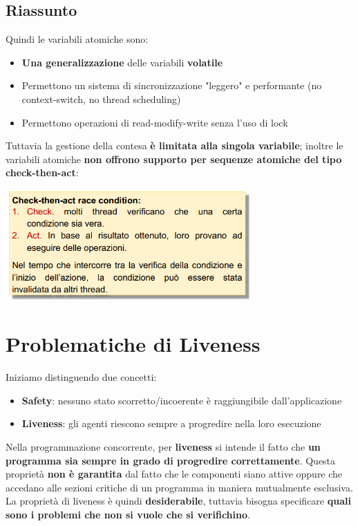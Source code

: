 \documentclass[12pt]{article}
\begin{document}
\subsection{Riassunto}
Quindi le variabili atomiche sono:
\begin{itemize}
    \item \textbf{Una generalizzazione} delle variabili \textbf{volatile}
    \item Permettono un sistema di sincronizzazione "leggero" e performante (no context-switch, no thread scheduling)
    \item Permettono operazioni di read-modify-write senza l'uso di lock
\end{itemize}
Tuttavia la gestione della contesa \textbf{è limitata alla singola variabile}; inoltre le variabili atomiche \textbf{non offrono supporto per sequenze atomiche del tipo check-then-act}:
\begin{center}
    \includegraphics[width = 0.70\textwidth]{Images/103.png}
\end{center}
\section{Problematiche di Liveness}
Iniziamo distinguendo due concetti:
\begin{itemize}
    \item \textbf{Safety}: nessuno stato scorretto/incoerente è raggiungibile dall'applicazione
    \item \textbf{Liveness}: gli agenti riescono sempre a progredire nella loro esecuzione
\end{itemize}
Nella programmazione concorrente, per \textbf{liveness} si intende il fatto che \textbf{un programma sia sempre in grado di progredire correttamente}. Questa proprietà \textbf{non è garantita} dal fatto che le componenti siano attive oppure che accedano alle sezioni critiche di un programma in maniera mutualmente esclusiva. La proprietà di liveness è quindi \textbf{desiderabile}, tuttavia bisogna specificare \textbf{quali sono i problemi che non si vuole che si verifichino}.
\end{document}
